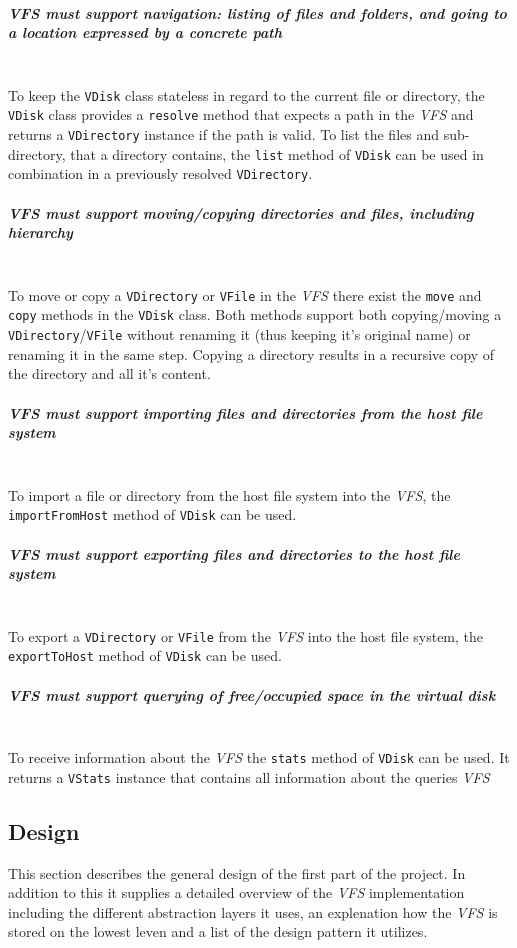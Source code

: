 \documentclass[a4paper,12pt]{article}
\begin{document}
\subparagraph{\emph{VFS} must support navigation: listing of files and folders, and going to a location expressed by a concrete path} \hfill\\
To keep the \texttt{VDisk} class stateless in regard to the current file or directory, the \texttt{VDisk} class provides a \texttt{resolve} method that expects a path in the \emph{VFS} and returns a \texttt{VDirectory} instance if the path is valid. To list the files and sub-directory, that a directory contains, the \texttt{list} method of \texttt{VDisk} can be used in combination in a previously resolved \texttt{VDirectory}.

\subparagraph{\emph{VFS} must support moving/copying directories and files, including hierarchy} \hfill\\
To move or copy a \texttt{VDirectory} or \texttt{VFile} in the \emph{VFS} there exist the \texttt{move} and \texttt{copy} methods in the \texttt{VDisk} class. Both methods support both copying/moving a \texttt{VDirectory}/\texttt{VFile} without renaming it (thus keeping it's original name) or renaming it in the same step. Copying a directory results in a recursive copy of the directory and all it's content.

\subparagraph{\emph{VFS} must support importing files and directories from the host file system} \hfill\\
To import a file or directory from the host file system into the \emph{VFS}, the \texttt{importFromHost} method of \texttt{VDisk} can be used.

\subparagraph{\emph{VFS} must support exporting files and directories to the host file system} \hfill\\
To export a \texttt{VDirectory} or \texttt{VFile} from the \emph{VFS} into the host file system, the \texttt{exportToHost} method of \texttt{VDisk} can be used.

\subparagraph{\emph{VFS} must support querying of free/occupied space in the virtual disk} \hfill\\
To receive information about the \emph{VFS} the \texttt{stats} method of \texttt{VDisk} can be used. It returns a \texttt{VStats} instance that contains all information about the queries \emph{VFS}

\subsection{Design}

This section describes the general design of the first part of the project. In addition to this it supplies a detailed overview of the \emph{VFS} implementation including the different abstraction layers it uses, an explenation how the \emph{VFS} is stored on the lowest leven and a list of the design pattern it utilizes.
\end{document}
